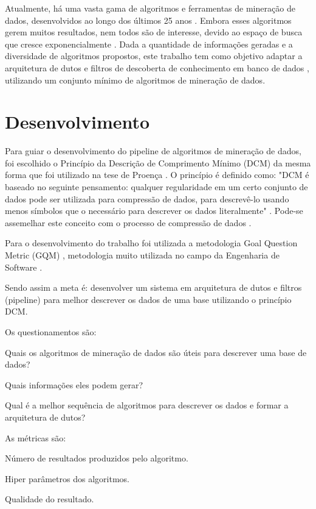 \documentclass[12pt]{article}
\begin{document}
Atualmente, há uma vasta gama de algoritmos e ferramentas \cite{mikut2011data} de mineração de dados, desenvolvidos ao longo dos últimos 25 anos \cite{luna2019frequent}. Embora esses algoritmos gerem muitos resultados, nem todos são de interesse, devido ao espaço de busca que cresce exponencialmente \cite{zaki2014data}. Dada a quantidade de informações geradas e a diversidade de algoritmos propostos, este trabalho tem como objetivo adaptar a arquitetura de dutos e filtros de descoberta de conhecimento em banco de dados \cite{nwagu2017knowledge}, utilizando um conjunto mínimo de algoritmos de mineração de dados.

\section{Desenvolvimento}

Para guiar o desenvolvimento do pipeline de algoritmos de mineração de dados, foi escolhido o Princípio da Descrição de Comprimento Mínimo (DCM) da mesma forma que foi utilizado na tese de Proença \cite{proencca2021robust}.  O princípio é definido como: "DCM é baseado no seguinte pensamento: qualquer regularidade em um certo conjunto de dados pode ser utilizada para compressão de dados, para descrevê-lo usando menos símbolos que o necessário para descrever os dados literalmente" \cite{grunwald2007minimum}. Pode-se assemelhar este conceito com o processo de compressão de dados  \cite{proencca2021robust}.

Para o desenvolvimento do trabalho foi utilizada a metodologia Goal Question Metric (GQM) \cite{caldiera1994goal}, metodologia muito utilizada no campo da Engenharia de Software \cite{sommerville2011software}. 

Sendo assim a meta é: desenvolver um sistema em arquitetura de dutos e filtros (pipeline) para melhor descrever os dados de uma base utilizando o princípio DCM. 

Os questionamentos são:
\begin{questions}
        \item Quais os algoritmos de mineração de dados são úteis para descrever uma base de dados?
        \item Quais informações eles podem gerar?
        \item Qual é a melhor sequência de algoritmos para descrever os dados e formar a arquitetura de dutos?
\end{questions}

As métricas são: 
\begin{metrics}
        \item Número de resultados produzidos pelo algoritmo.
        \item Hiper parâmetros dos algoritmos.
        \item Qualidade do resultado.
\end{metrics}
\end{document}
